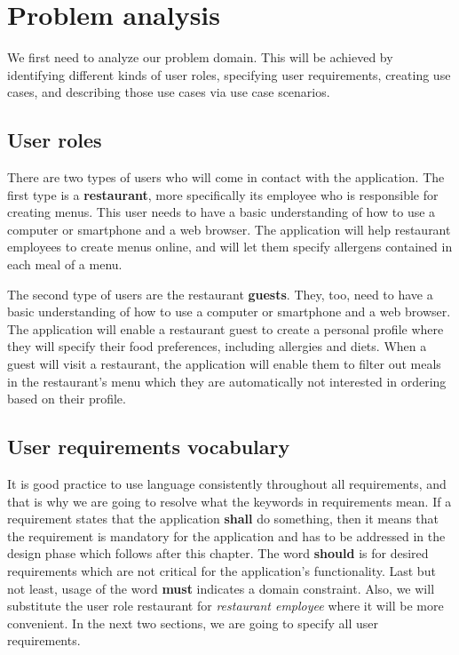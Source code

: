 \chapter{Problem analysis}
We first need to analyze our problem domain.
This will be achieved by identifying different kinds of user roles, specifying user requirements, creating use cases, and describing those use cases via use case scenarios.

\section{User roles}
There are two types of users who will come in contact with the application.
The first type is a \textbf{restaurant}, more specifically its employee who is responsible for creating menus.
This user needs to have a basic understanding of how to use a computer or smartphone and a web browser.
The application will help restaurant employees to create menus online, and will let them specify allergens contained in each meal of a menu.

The second type of users are the restaurant \textbf{guests}.
They, too, need to have a basic understanding of how to use a computer or smartphone and a web browser.
The application will enable a restaurant guest to create a personal profile where they will specify their food preferences, including allergies and diets.
When a guest will visit a restaurant, the application will enable them to filter out meals in the restaurant's menu which they are automatically not interested in ordering based on their profile.

\section{User requirements vocabulary}
It is good practice to use language consistently throughout all requirements, and that is why we are going to resolve what the keywords in requirements mean.
If a requirement states that the application \textbf{shall} do something, then it means that the requirement is mandatory for the application and has to be addressed in the design phase which follows after this chapter. 
The word \textbf{should} is for desired requirements which are not critical for the application's functionality.
Last but not least, usage of the word \textbf{must} indicates a domain constraint.
Also, we will substitute the user role restaurant for \emph{restaurant employee} where it will be more convenient.
In the next two sections, we are going to specify all user requirements. 

